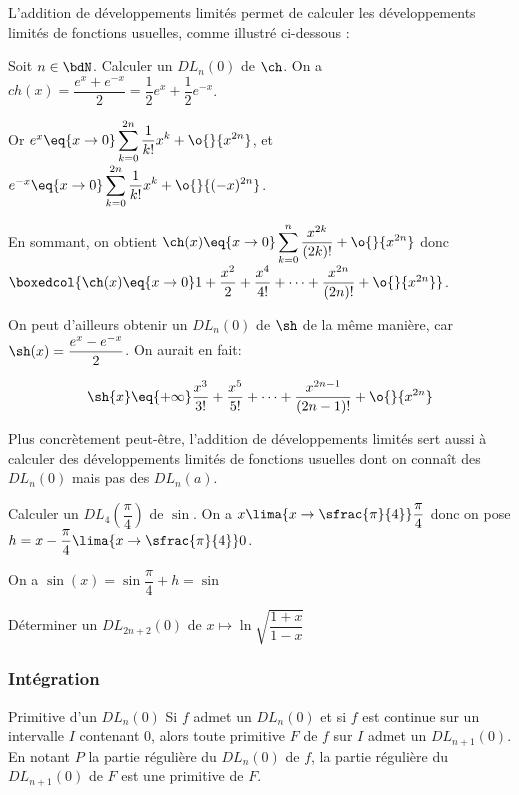 \documentclass[a4paper,french,bookmarks]{article}
\begin{document}
\demo{}

L'addition de développements limités permet de calculer les développements limités de fonctions  usuelles, comme illustré ci-dessous :
\begin{example}{}{}
    Soit $n \in \bdN$. Calculer un $DL_{n}(0)$ de $\ch$.
    \tcblower
    On a $ch(x) = \dfrac{e^x+e^{-x}}{2} = \dfrac{1}{2}e^x+\dfrac{1}{2}e^{-x}$.
    
    Or $e^x \eq{x \to 0} \displaystyle \sum_{k=0}^{2n} \dfrac{1}{k!}x^k + \o{}{x^{2n}}$, et $e^{-x} \eq{x \to 0} \displaystyle \sum_{k=0}^{2n} \dfrac{1}{k!}x^k + \o{}{(-x)^{2n}}$.
    
    En sommant, on obtient $\ch(x) \eq{x \to 0} \displaystyle \sum_{k=0}^{n} \dfrac{x^{2k}}{(2k)!} + \o{}{x^{2n}}$ donc $\boxedcol{\ch(x) \eq{x \to 0} 1 + \dfrac{x^2}{2}+\dfrac{x^4}{4!} + \dots + \dfrac{x^{2n}}{(2n)!} + \o{}{x^{2n}}}$.
\end{example}

On peut d'ailleurs obtenir un $DL_n(0)$ de $\sh$ de la même manière, car $\sh(x) = \dfrac{e^x-e^{-x}}{2}$. On aurait en fait:

\[\sh{x} \eq{+\infty} \dfrac{x^3}{3!} + \dfrac{x^5}{5!} + \dots + \dfrac{x^{2n-1}}{(2n-1)!} + \o{}{x^{2n}}\]

Plus concrètement peut-être, l'addition de développements limités sert aussi à calculer des développements limités de fonctions usuelles dont on connaît des $DL_n(0)$ mais pas des $DL_n(a)$.

\begin{example}{}{}
    Calculer un $DL_4\left(\dfrac{\pi}{4}\right)$ de $\sin$.
    \tcblower
    On a $x \lima{x \to \sfrac{\pi}{4}} \dfrac{\pi}{4}$ donc on pose $h = x - \dfrac{\pi}{4} \lima{x \to \sfrac{\pi}{4}} 0$.
    
    On a $\sin(x) = \sin{\dfrac{\pi}{4}+h} = \sin{}$
\end{example}

\begin{example}{}{}
    Déterminer un $DL_{2n+2}(0)$ de $x \mapsto \ln{\sqrt{\dfrac{1+x}{1-x}}}$
    \tcblower
\end{example}

\subsubsection{Intégration}

\begin{theorem}{Primitive d'un $DL_n(0)$}{}
    Si $f$ admet un $DL_n(0)$ et si $f$ est continue sur un intervalle $I$ contenant $0$, alors toute primitive $F$ de $f$ sur $I$ admet un $DL_{n+1}(0)$.
    En notant $P$ la partie régulière du $DL_n(0)$ de $f$, la partie régulière du $DL_{n+1}(0)$ de $F$ est une primitive de $F$.
\end{theorem}
\end{document}
